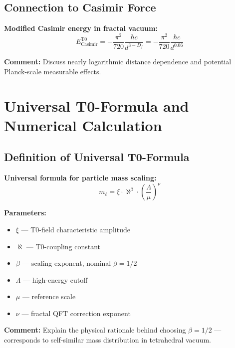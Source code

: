 \documentclass[12pt,a4paper]{article}
\newcommand{\xipar}{\xi}            %
\newcommand{\nulep}{\nu}            %
\begin{document}
\subsection{Connection to Casimir Force}

\textbf{Modified Casimir energy in fractal vacuum:}
\begin{equation}
	E_{\text{Casimir}}^{\text{T0}} = -\frac{\pi^2}{720} \frac{\hbar c}{d^{3-D_f}} = -\frac{\pi^2}{720} \frac{\hbar c}{d^{0.06}}
\end{equation}

\textbf{Comment:} Discuss nearly logarithmic distance dependence and potential Planck-scale measurable effects.
\section{Universal T0-Formula and Numerical Calculation}

\subsection{Definition of Universal T0-Formula}

\textbf{Universal formula for particle mass scaling:}
\begin{equation}
	m_\ell = \xipar \cdot \aleph^\beta \cdot \left( \frac{\Lambda}{\mu} \right)^\nulep
\end{equation}

\textbf{Parameters:}
\begin{itemize}
	\item $\xipar$ — T0-field characteristic amplitude
	\item $\aleph$ — T0-coupling constant
	\item $\beta$ — scaling exponent, nominal $\beta = 1/2$
	\item $\Lambda$ — high-energy cutoff
	\item $\mu$ — reference scale
	\item $\nulep$ — fractal QFT correction exponent
\end{itemize}

\textbf{Comment:} Explain the physical rationale behind choosing $\beta = 1/2$ — corresponds to self-similar mass distribution in tetrahedral vacuum.
\end{document}
